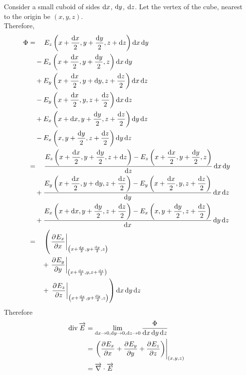 \documentclass[fleqn, a4paper, 12pt, twoside]{article}
\theoremstyle{definition}
\theoremstyle{theorem}
\newcommand{\divergence}{\mathrm{div\,}}
\begin{document}
Consider a small cuboid of sides $\dif x$, $\dif y$, $\dif z$.
Let the vertex of the cube, nearest to the origin be $(x,y,z)$.\\
Therefore,
\begin{align*}
	\Phi &= \quad E_z \left( x + \dfrac{\dif x}{2}, y + \dfrac{\dif y}{2}, z + \dif z \right) \dif x \dif y\\
	&\quad - E_z \left( x + \dfrac{\dif x}{2}, y + \dfrac{\dif y}{2}, z \right) \dif x \dif y\\
	&\quad + E_y \left( x + \dfrac{\dif x}{2}, y + \dif y, z + \dfrac{\dif z}{2} \right) \dif x \dif z\\
	&\quad  - E_y \left( x + \dfrac{\dif x}{2}, y, z + \dfrac{\dif z}{2} \right) \dif x \dif z\\
	&\quad + E_x \left( x + \dif x, y + \dfrac{\dif y}{2}, z + \dfrac{\dif z}{2} \right) \dif y \dif z\\
	&\quad  - E_x \left( x, y + \dfrac{\dif y}{2}, z + \dfrac{\dif z}{2} \right) \dif y \dif z\\
	&= \quad \dfrac{E_z \left( x + \dfrac{\dif x}{2}, y + \dfrac{\dif y}{2}, z + \dif z \right) - E_z \left( x + \dfrac{\dif x}{2}, y + \dfrac{\dif y}{2}, z \right)}{\dif z} \dif x \dif y\\
	&\quad + \dfrac{E_y \left( x + \dfrac{\dif x}{2}, y + \dif y, z + \dfrac{\dif z}{2} \right) - E_y \left( x + \dfrac{\dif x}{2}, y, z + \dfrac{\dif z}{2} \right)}{\dif y} \dif x \dif z\\
	&\quad + \dfrac{E_x \left( x + \dif x, y + \dfrac{\dif y}{2}, z + \dfrac{\dif z}{2} \right) - E_x \left( x, y + \dfrac{\dif y}{2}, z + \dfrac{\dif z}{2} \right)}{\dif x} \dif y \dif z\\
	&= \quad \left( \left. \dpd{E_x}{x} \right|_{\left( x + \frac{\dif x}{2}, y + \frac{\dif y}{2}, z \right)} \right.\\
	&\quad \quad + \left. \dpd{E_y}{y} \right|_{\left( x + \frac{\dif x}{2}, y, z + \frac{\dif z}{2} \right)}\\
	&\quad \quad + \left. \left. \dpd{E_z}{z} \right|_{\left( x + \frac{\dif x}{2}, y + \frac{\dif y}{2}, z \right)} \right) \dif x \dif y \dif z\\
\end{align*}
Therefore
\begin{align*}
	\divergence \overrightarrow{E} &= \lim\limits_{\dif x \to 0, \dif y \to 0, \dif z \to 0} \dfrac{\Phi}{\dif x \dif y \dif z}\\
	&= \left. \left( \dpd{E_x}{x} + \dpd{E_y}{y} + \dpd{E_z}{z} \right) \right|_{(x,y,z)}\\
	&= \overrightarrow{\nabla} \cdot \overrightarrow{E}
\end{align*}
\end{document}
